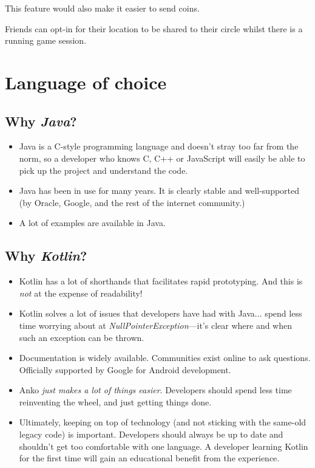 \documentclass[a4paper]{article}
\begin{document}
This feature would also make it easier to send coins.

Friends can opt-in for their location to be shared to their circle whilst there is a running game session.

\pagebreak

\section{Language of choice}
\label{sec:language}


\subsection{Why \emph{Java}?}
\begin{itemize}
    \item Java is a C-style programming language and doesn't stray too far from the norm, so a developer who knows C, C++ or JavaScript will easily be able to pick up the project and understand the code.
    \item Java has been in use for many years. It is clearly stable and well-supported (by Oracle, Google, and the rest of the internet community.)
    \item A lot of examples are available in Java.
\end{itemize}

\subsection{Why \emph{Kotlin}?}
\begin{itemize}
    \item Kotlin has a lot of shorthands that facilitates rapid prototyping. And this is \emph{not} at the expense of readability!\cite{whykotlin}
    \item Kotlin solves a lot of issues that developers have had with Java... spend less time worrying about at \emph{NullPointerException}---it's clear where and when such an exception can be thrown.
    \item Documentation is widely available. Communities exist online\cite{kotlincommunity} to ask questions. Officially supported by Google for Android development.
    \item Anko \emph{just makes a lot of things easier}. Developers should spend less time reinventing the wheel, and just getting things done.
    \item Ultimately, keeping on top of technology (and not sticking with the same-old legacy code) is important. Developers should always be up to date and shouldn't get too comfortable with one language. A developer learning Kotlin for the first time will gain an educational benefit from the experience.
\end{itemize}
\end{document}
